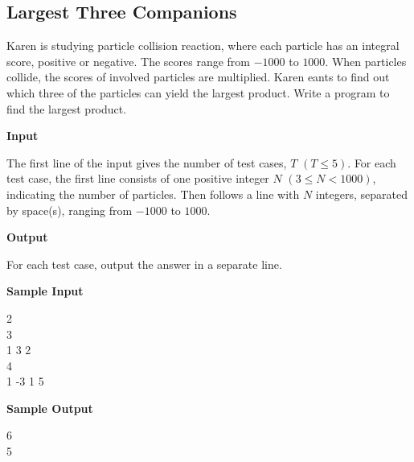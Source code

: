 \subsection{Largest Three Companions}
Karen is studying particle collision reaction, where each particle has an integral score, positive or negative. The scores range from $-1000$ to $1000$. When particles collide, the scores of involved particles are multiplied. Karen eants to find out which three of the particles can yield the largest product. Write a program to find the largest product.

\begin{flushleft}
{\color{red} \textbf{Input}}
\end{flushleft}
The first line of the input gives the number of test cases, $T$ $(T \leq 5)$. For each test case, the first line consists of one positive integer $N$ $(3 \leq N < 1000)$, indicating the number of particles. Then follows a line with $N$ integers, separated by space(s), ranging from $-1000$ to $1000$.

\begin{flushleft}
{\color{red} \textbf{Output}}
\end{flushleft}
For each test case, output the answer in a separate line.

\begin{flushleft}
{\color{red} \textbf{Sample Input}}
\end{flushleft}
\begin{flushleft}
2\\
3\\
1 3 2\\
4\\
1 -3 1 5\\
\end{flushleft}

\begin{flushleft}
{\color{red} \textbf{Sample Output}}
\end{flushleft}
\begin{flushleft}
6\\
5\\
\end{flushleft}

\newpage